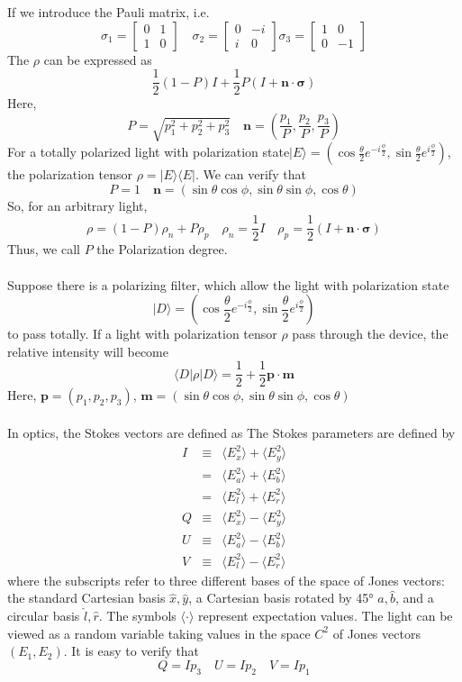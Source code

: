 \documentclass[cyan]{elegantnote}
\begin{document}
If we introduce the Pauli matrix, i.e.
\[\sigma_1 = \left[ \begin{matrix} 0& 1\\ 1& 0\end{matrix} \right] \quad \sigma_2 = \left[ \begin{matrix} 0& - i\\ i& 0\end{matrix} \right] \sigma_3 = \left[ \begin{matrix} 1& 0\\ 0& -1\end{matrix} \right] \]
The $\rho$ can be expressed as
\[\frac{1}{2} (1-P) I + \frac{1}{2} P(I + \bm{n} \cdot \bm{\sigma})\]
Here,
\[P = \sqrt{p_1^2 + p_2^2 + p_3^2} \quad \bm{n} = (\frac{p_1}{P},\frac{p_2}{P},\frac{p_3}{P})\]
For a totally polarized light with polarization state$ | E\rangle = (\cos \frac{\theta}{2} e^{-i\frac{\phi}{2}} , \sin \frac{\theta}{2} e^{i\frac{\phi}{2}})$, the polarization tensor $\rho = |E\rangle \langle E|$. We can verify that
\[P = 1 \quad \bm{n} = (\sin\theta \cos\phi, \sin\theta \sin\phi, \cos \theta)\]
So, for an arbitrary light,
\[\rho = (1-P)\rho_{n} + P \rho_{p} \quad \rho_n = \frac{1}{2}I \quad \rho_p = \frac{1}{2}(I + \bm{n} \cdot \bm{\sigma})\]
Thus, we call $P$ the Polarization degree. \\ \\
Suppose there is a polarizing filter,  which allow the light with polarization state
\[| D \rangle = (\cos \frac{\theta}{2} e^{-i\frac{\phi}{2}} , \sin \frac{\theta}{2} e^{i\frac{\phi}{2}})\]
to pass totally. If a light with polarization tensor $\rho$ pass through the device, the relative intensity will become
\[\langle D | \rho | D \rangle = \frac{1}{2} + \frac{1}{2} \bm{p} \cdot \bm{m}\]
Here, $\bm{p} = (p_1,p_2,p_3)$, $\bm{m} = (\sin\theta \cos\phi, \sin\theta \sin\phi, \cos \theta)$\\ \\
In optics, the Stokes vectors are defined as
The Stokes parameters are defined by
\begin{eqnarray}
I&\equiv& \langle E_{x}^{2}\rangle +\langle E_{y}^{2}\rangle \nonumber \\
&=& \langle E_{a}^{2}\rangle +\langle E_{b}^{2}\rangle \nonumber \\
&=& \langle E_{l}^{2}\rangle +\langle E_{r}^{2}\rangle \nonumber \\
Q&\equiv& \langle E_{x}^{2}\rangle -\langle E_{y}^{2}\rangle \nonumber \\
U&\equiv& \langle E_{a}^{2}\rangle -\langle E_{b}^{2}\rangle \nonumber \\
V&\equiv& \langle E_{l}^{2}\rangle -\langle E_{r}^{2}\rangle \nonumber
\end{eqnarray}
where the subscripts refer to three different bases of the space of Jones vectors: the standard Cartesian basis ${\hat {x}},{\hat {y}}$, a Cartesian basis rotated by 45° ${\hat {a}},{\hat {b}}$, and a circular basis ${\hat {l}},{\hat {r}}$. The symbols $\langle \cdot \rangle$ represent expectation values. The light can be viewed as a random variable taking values in the space $C^2$ of Jones vectors $(E_1,E_2)$. It is easy to verify that
\[Q = Ip_3 \quad U = Ip_2 \quad V = Ip_1\]
\end{document}
